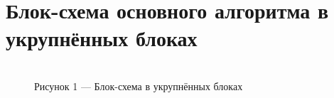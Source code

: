 \documentclass[a4paper,12pt]{article}
\begin{document}
\section{Блок-схема основного алгоритма в укрупнённых блоках} {
\begin{figure}[h!]
	{\\Рисунок 1 — Блок-схема в укрупнённых блоках}
\end{figure}

}
\end{document}
